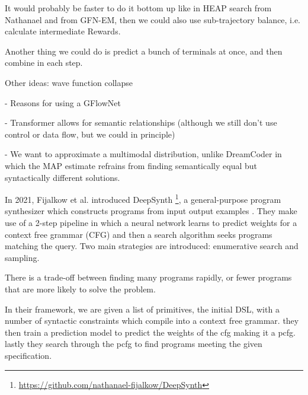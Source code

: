 It would probably be faster to do it bottom up like in HEAP search from Nathanael and from GFN-EM, then we could also use sub-trajectory balance, i.e. calculate intermediate Rewards. 

Another thing we could do is predict a bunch of terminals at once, and then combine in each step. 

Other ideas: wave function collapse



- Reasons for using a GFlowNet

- Transformer allows for semantic relationships (although we still don't use control or data flow, but we could in principle)

- We want to approximate a multimodal distribution, unlike DreamCoder in which the MAP estimate refrains from finding semantically equal but syntactically different solutions. 






In 2021, Fijalkow et al. introduced DeepSynth \footnote{\url{https://github.com/nathanael-fijalkow/DeepSynth}}, a general-purpose program synthesizer which constructs programs from input output examples \cite{fijalkow_scaling_2021}. They make use of a 2-step pipeline in which a neural network learns to predict weights for a context free grammar (CFG) and then a search algorithm seeks programs matching the query. 
Two main strategies are introduced: enumerative search and sampling.

There is a trade-off between finding many programs rapidly, or fewer programs that are more likely to solve the problem.


In their framework, we are given a list of primitives, the initial DSL, with a number of syntactic constraints which compile into a context free grammar. they then train a prediction model to predict the weights of the cfg making it a pcfg. lastly they search through the pcfg to find programs meeting the given specification. 

